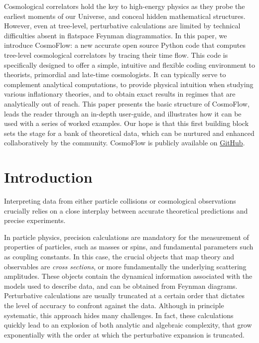 \documentclass[11pt]{article}
\numberwithin{equation}{section} %
\begin{document}
\begin{titlepage}
\noindent Cosmological correlators hold the key to high-energy physics as they probe the earliest moments of our Universe, and conceal hidden mathematical structures. However, even at tree-level, perturbative calculations are limited by technical difficulties absent in flatspace Feynman diagrammatics. In this paper, we introduce \textsf{CosmoFlow}: a new accurate open source Python code that computes tree-level cosmological correlators by tracing their time flow. This code is specifically designed to offer a simple, intuitive and flexible coding environment to theorists, primordial and late-time cosmologists. It can typically serve to complement analytical computations, to provide physical intuition when studying various inflationary theories, and to obtain exact results in regimes that are analytically out of reach. This paper presents the basic structure of \textsf{CosmoFlow}, leads the reader through an in-depth user-guide, and illustrates how it can be used with a series of worked examples. Our hope is that this first building block sets the stage for a bank of theoretical data, which can be nurtured and enhanced collaboratively by the community. \textsf{CosmoFlow} is publicly available on \href{https://github.com/deniswerth/CosmoFlow}{GitHub}.


\end{titlepage}

\setcounter{page}{2}

\restoregeometry

\begin{spacing}{1.2}
\newpage
\setcounter{tocdepth}{3}
\tableofcontents
\end{spacing}

\newpage

\section{Introduction}

Interpreting data from either particle collisions or cosmological observations crucially relies on a close interplay between accurate theoretical predictions and precise experiments. 


\vskip 4pt
In particle physics, precision calculations are mandatory for the measurement of properties of particles, such as masses or spins, and fundamental parameters such as coupling constants. In this case, the crucial objects that map theory and observables are \textit{cross sections}, or more fundamentally the underlying scattering amplitudes. These objects contain the dynamical information associated with the models used to describe data, and can be obtained from Feynman diagrams. Perturbative calculations are usually truncated at a certain order that dictates the level of accuracy to confront against the data. Although in principle systematic, this approach hides many challenges. In fact, these calculations quickly lead to an explosion of both analytic and algebraic complexity, that grow exponentially with the order at which the perturbative expansion is truncated. 
\end{document}
